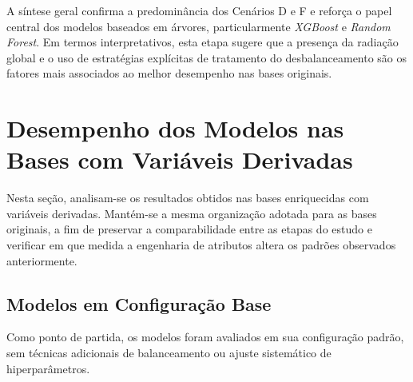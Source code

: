 A síntese geral confirma a predominância dos Cenários D e F e reforça o papel central dos modelos baseados em árvores, particularmente \textit{XGBoost} e \textit{Random Forest}. Em termos interpretativos, esta etapa sugere que a presença da radiação global e o uso de estratégias explícitas de tratamento do desbalanceamento são os fatores mais associados ao melhor desempenho nas bases originais.

\section{Desempenho dos Modelos nas Bases com Variáveis Derivadas}

Nesta seção, analisam-se os resultados obtidos nas bases enriquecidas com variáveis derivadas. Mantém-se a mesma organização adotada para as bases originais, a fim de preservar a comparabilidade entre as etapas do estudo e verificar em que medida a engenharia de atributos altera os padrões observados anteriormente.

\subsection{Modelos em Configuração Base}

Como ponto de partida, os modelos foram avaliados em sua configuração padrão, sem técnicas adicionais de balanceamento ou ajuste sistemático de hiperparâmetros.

\begingroup
\footnotesize
\setlength{\tabcolsep}{4pt}

